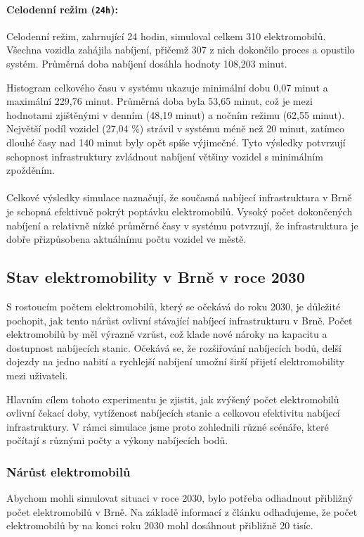 \documentclass[a4paper,11pt]{article}
\begin{document}
\paragraph{Celodenní režim (\texttt{24h}):}
Celodenní režim, zahrnující 24 hodin, simuloval celkem 310 elektromobilů. Všechna vozidla zahájila nabíjení, přičemž 307 z nich dokončilo proces a opustilo systém. Průměrná doba nabíjení dosáhla hodnoty 108,203 minut.

Histogram celkového času v systému ukazuje minimální dobu 0,07 minut a maximální 229,76 minut. Průměrná doba byla 53,65 minut, což je mezi hodnotami zjištěnými v denním (48,19 minut) a nočním režimu (62,55 minut). Největší podíl vozidel (27,04 \%) strávil v systému méně než 20 minut, zatímco dlouhé časy nad 140 minut byly opět spíše výjimečné. Tyto výsledky potvrzují schopnost infrastruktury zvládnout nabíjení většiny vozidel s minimálním zpožděním.

\paragraph{} 
Celkové výsledky simulace naznačují, že současná nabíjecí infrastruktura v Brně je schopná efektivně pokrýt poptávku elektromobilů. Vysoký počet dokončených nabíjení a relativně nízké průměrné časy v systému potvrzují, že infrastruktura je dobře přizpůsobena aktuálnímu počtu vozidel ve městě.

\subsection{Stav elektromobility v Brně v roce 2030}

S rostoucím počtem elektromobilů, který se očekává do roku 2030, je důležité pochopit, jak tento nárůst ovlivní stávající nabíjecí infrastrukturu v Brně. Počet elektromobilů by měl výrazně vzrůst, což klade nové nároky na kapacitu a dostupnost nabíjecích stanic. Očekává se, že rozšiřování nabíjecích bodů, delší dojezdy na jedno nabití a rychlejší nabíjení umožní širší přijetí elektromobility mezi uživateli. \cite{electromobiles_in_future}

Hlavním cílem tohoto experimentu je zjistit, jak zvýšený počet elektromobilů ovlivní čekací doby, vytíženost nabíjecích stanic a celkovou efektivitu nabíjecí infrastruktury. V rámci simulace jsme proto zohlednili různé scénáře, které počítají s různými počty a výkony nabíjecích bodů.

\subsubsection{Nárůst elektromobilů}
Abychom mohli simulovat situaci v roce 2030, bylo potřeba odhadnout přibližný počet elektromobilů v Brně. Na základě informací z článku \cite{ev_growth} odhadujeme, že počet elektromobilů by na konci roku 2030 mohl dosáhnout přibližně 20 tisíc.
\end{document}
